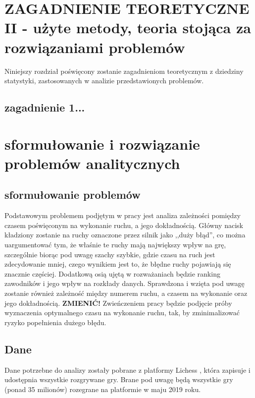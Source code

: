 \documentclass[inzynierska]{pwr_wmat_praca_dyplomowa}
\theoremstyle{plain}
\numberwithin{theorem}{chapter}
\theoremstyle{definition}
\numberwithin{theorem}{chapter}
\begin{document}
\chapter{ZAGADNIENIE TEORETYCZNE II - użyte metody, teoria stojąca za rozwiązaniami problemów}
Niniejszy rozdział poświęcony zostanie zagadnieniom teoretycznym z dziedziny statystyki, zastosowanych w analizie przedstawionych problemów.
\section{zagadnienie 1...}

\chapter{sformułowanie i rozwiązanie problemów analitycznych}
\section{sformułowanie problemów}
Podstawowym problemem podjętym w pracy jest analiza zależności pomiędzy czasem poświęconym na wykonanie ruchu, a jego dokładnością. Główny nacisk kładziony zostanie na ruchy oznaczone przez silnik jako ,,duży błąd'', co można uargumentować tym, że właśnie te ruchy mają największy wpływ na grę, szczególnie biorąc pod uwagę szachy szybkie, gdzie czasu na ruch jest zdecydowanie mniej, czego wynikiem jest to, że błędne ruchy pojawiają się znacznie częściej. Dodatkową osią ujętą w rozważaniach będzie ranking zawodników i jego wpływ na rozkłady danych. Sprawdzona i wzięta pod uwagę zostanie również zależność między numerem ruchu, a czasem na wykonanie oraz jego dokładnością.
\textbf{ZMIENIĆ!} Zwieńczeniem pracy będzie podjęcie próby wyznaczenia optymalnego czasu na wykonanie ruchu, tak, by zminimalizować ryzyko popełnienia dużego błędu.

\section{Dane}
Dane potrzebne do analizy zostały pobrane z platformy Lichess \cite{lichess}, która zapisuje i udostępnia wszystkie rozgrywane gry. Brane pod uwagę będą wszystkie gry (ponad 35 milionów) rozegrane na platformie w maju 2019 roku.
\end{document}

